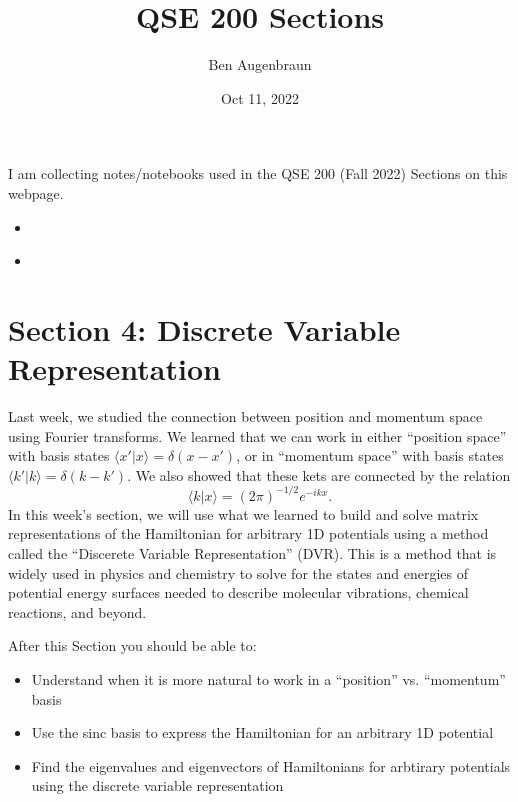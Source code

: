 \documentclass[letterpaper,10pt,english]{jupyterBook}
\title{QSE 200 Sections}
\date{Oct 11, 2022}
\author{Ben Augenbraun}
\begin{document}
\pagestyle{empty}
\sphinxmaketitle
\pagestyle{plain}
\sphinxtableofcontents
\pagestyle{normal}
\label{\detokenize{home::doc}}


\sphinxAtStartPar
I am collecting notes/notebooks used in the QSE 200 (Fall 2022) Sections on this webpage.
\begin{itemize}
\item {} 
\sphinxAtStartPar
{\hyperref[\detokenize{Section4_v2::doc}]{}}

\item {} 
\sphinxAtStartPar
{\hyperref[\detokenize{Section6_v2::doc}]{}}

\end{itemize}


\chapter{Section 4: Discrete Variable Representation}
\label{\detokenize{Section4_v2:section-4-discrete-variable-representation}}\label{\detokenize{Section4_v2::doc}}
\sphinxAtStartPar
Last week, we studied the connection between position and momentum space using Fourier transforms. We learned that we can work in either “position space” with basis states \(\langle x' | x \rangle = \delta(x-x')\), or in “momentum space” with basis states \(\langle k' | k \rangle = \delta(k-k')\). We also showed that these kets are connected by the relation
\label{equation:Section4_v2:781d4ce0-a6c5-4224-a0e6-7c9f70db8d33}\begin{equation}
\langle k | x \rangle = (2\pi)^{-1/2} e^{-i k x}.
\end{equation}
\sphinxAtStartPar
In this week’s section, we will use what we learned to build and solve matrix representations of the Hamiltonian for arbitrary 1D potentials using a method called the “Discerete Variable Representation” (DVR). This is a method that is widely used in physics and chemistry to solve for the states and energies of potential energy surfaces needed to describe molecular vibrations, chemical reactions, and beyond.

\sphinxAtStartPar
{}
After this Section you should be able to:
\begin{itemize}
\item {} 
\sphinxAtStartPar
Understand when it is more natural to work in a “position” vs. “momentum” basis

\item {} 
\sphinxAtStartPar
Use the sinc basis to express the Hamiltonian for an arbitrary 1D potential

\item {} 
\sphinxAtStartPar
Find the eigenvalues and eigenvectors of Hamiltonians for arbtirary potentials using the discrete variable representation

\end{itemize}
\end{document}
